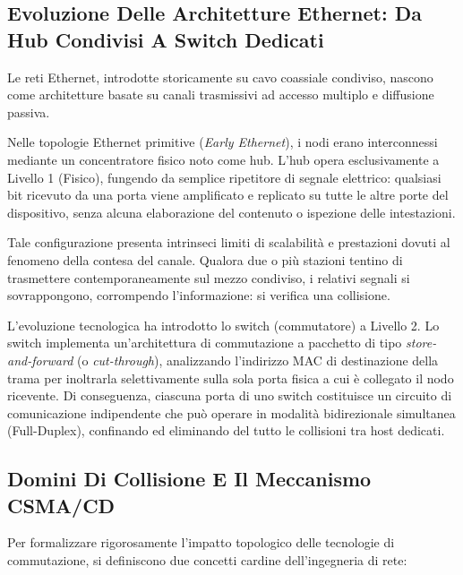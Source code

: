 \documentclass[11pt, a4paper]{article}
\begin{document}
\subsection{Evoluzione Delle Architetture Ethernet: Da Hub Condivisi A Switch Dedicati}

Le reti Ethernet, introdotte storicamente su cavo coassiale condiviso, nascono come architetture basate su canali trasmissivi ad accesso multiplo e diffusione passiva.

Nelle topologie Ethernet primitive (\emph{Early Ethernet}), i nodi erano interconnessi mediante un concentratore fisico noto come hub. L'hub opera esclusivamente a Livello 1 (Fisico), fungendo da semplice ripetitore di segnale elettrico: qualsiasi bit ricevuto da una porta viene amplificato e replicato su tutte le altre porte del dispositivo, senza alcuna elaborazione del contenuto o ispezione delle intestazioni.


Tale configurazione presenta intrinseci limiti di scalabilità e prestazioni dovuti al fenomeno della contesa del canale. Qualora due o più stazioni tentino di trasmettere contemporaneamente sul mezzo condiviso, i relativi segnali si sovrappongono, corrompendo l'informazione: si verifica una collisione.

L'evoluzione tecnologica ha introdotto lo switch (commutatore) a Livello 2. Lo switch implementa un'architettura di commutazione a pacchetto di tipo \emph{store-and-forward} (o \emph{cut-through}), analizzando l'indirizzo MAC di destinazione della trama per inoltrarla selettivamente sulla sola porta fisica a cui è collegato il nodo ricevente. Di conseguenza, ciascuna porta di uno switch costituisce un circuito di comunicazione indipendente che può operare in modalità bidirezionale simultanea (Full-Duplex), confinando ed eliminando del tutto le collisioni tra host dedicati.

\subsection{Domini Di Collisione E Il Meccanismo CSMA/CD}

Per formalizzare rigorosamente l'impatto topologico delle tecnologie di commutazione, si definiscono due concetti cardine dell'ingegneria di rete:
\end{document}
